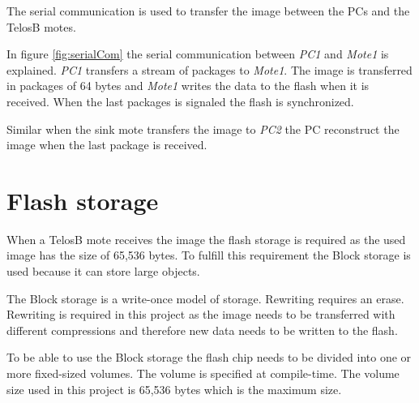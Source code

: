 


The serial communication is used to transfer the image between the PCs and the TelosB motes. 

In figure \ref{fig:serialCom} the serial communication between \emph{PC1} and \emph{Mote1} is explained. \emph{PC1} transfers a stream of packages to \emph{Mote1}. The image is transferred in packages of 64 bytes and \emph{Mote1} writes the data to the flash when it is received. When the last packages is signaled the flash is synchronized.


Similar when the sink mote transfers the image to \emph{PC2} the PC reconstruct the image when the last package is received.

\section{Flash storage}

When a TelosB mote receives the image the flash storage is required as the used image has the size of 65,536 bytes. To fulfill this requirement the Block storage is used because it can store large objects.

The Block storage is a write-once model of storage. Rewriting requires an erase. Rewriting is required in this project as the image needs to be transferred with different compressions and therefore new data needs to be written to the flash.

To be able to use the Block storage the flash chip needs to be divided into one or more fixed-sized volumes. The volume is specified at compile-time. The volume size used in this project is 65,536 bytes which is the maximum size.

